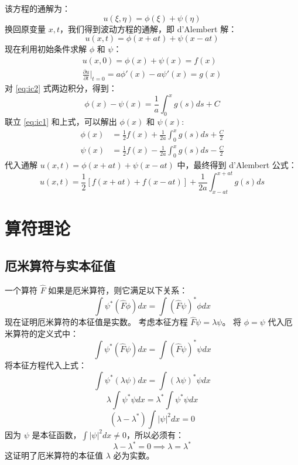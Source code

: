 \documentclass{article}
\begin{document}
	该方程的通解为：
	$$
	u(\xi, \eta) = \phi(\xi) + \psi(\eta)
	$$
	换回原变量 $x, t$，我们得到波动方程的通解，即 d'Alembert 解：
	$$
	u(x,t) = \phi(x+at) + \psi(x-at)
	$$
	现在利用初始条件求解 $\phi$ 和 $\psi$：
	\begin{gather*}
		u(x,0) = \phi(x) + \psi(x) = f(x) \label{eq:ic1} \\
		\frac{\partial u}{\partial t}\bigg|_{t=0} = a\phi'(x) - a\psi'(x) = g(x) \label{eq:ic2}
	\end{gather*}
	对 \eqref{eq:ic2} 式两边积分，得到：
	$$
	\phi(x) - \psi(x) = \frac{1}{a} \int_0^x g(s) ds + C
	$$
	联立 \eqref{eq:ic1} 和上式，可以解出 $\phi(x)$ 和 $\psi(x)$:
	\begin{align*}
		\phi(x) &= \frac{1}{2}f(x) + \frac{1}{2a} \int_0^x g(s)ds + \frac{C}{2} \\
		\psi(x) &= \frac{1}{2}f(x) - \frac{1}{2a} \int_0^x g(s)ds - \frac{C}{2}
	\end{align*}
	代入通解 $u(x,t) = \phi(x+at) + \psi(x-at)$ 中，最终得到 d'Alembert 公式：
	$$
	u(x,t) = \frac{1}{2}\left[ f(x+at) + f(x-at) \right] + \frac{1}{2a} \int_{x-at}^{x+at} g(s) ds
	$$
	
	\section{算符理论}
	
	\subsection{厄米算符与实本征值}
	一个算符 $\hat{F}$ 如果是厄米算符，则它满足以下关系：
	$$
	\int \psi^* (\hat{F} \phi) dx = \int (\hat{F} \psi)^* \phi dx
	$$
	现在证明厄米算符的本征值是实数。
	考虑本征方程 $\hat{F}\psi = \lambda\psi$。
	将 $\phi = \psi$ 代入厄米算符的定义式中：
	$$
	\int \psi^* (\hat{F} \psi) dx = \int (\hat{F} \psi)^* \psi dx
	$$
	将本征方程代入上式：
	$$
	\int \psi^* (\lambda\psi) dx = \int (\lambda\psi)^* \psi dx
	$$
	$$
	\lambda \int \psi^* \psi dx = \lambda^* \int \psi^* \psi dx
	$$
	$$
	(\lambda - \lambda^*) \int |\psi|^2 dx = 0
	$$
	因为 $\psi$ 是本征函数，$\int |\psi|^2 dx \neq 0$，所以必须有：
	$$
	\lambda - \lambda^* = 0 \implies \lambda = \lambda^*
	$$
	这证明了厄米算符的本征值 $\lambda$ 必为实数。
	
\end{document}

